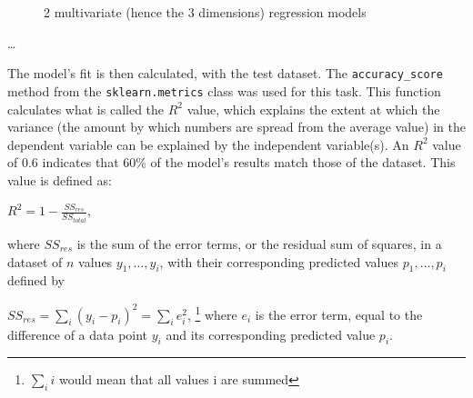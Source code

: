 \documentclass[11pt,letterpaper]{article}
\begin{document}
\begin{figure}[h]
    \centering
    \qquad
    \caption{2 multivariate (hence the 3 dimensions) regression models}
    \label{fig:example}
\end{figure}


\dots

The model's fit is then calculated, with the test dataset. The \verb|accuracy_score| method 
from the \verb|sklearn.metrics| class was used for this task. This function calculates what 
is called the $R^2$ value, which explains the extent at which the variance (the amount by which numbers 
are spread from the average value) in the dependent variable can be explained by the independent 
variable(s). An $R^2$ value of 0.6 indicates that 60\% of the model's results match those of the 
dataset. This value is defined as: 

$R^2 = 1 - \frac{SS_{res}}{SS_{total}}$,

where $SS_{res}$ is the sum of the error terms, or the residual sum of squares, in a dataset of $n$ 
values $y_1,\dots, y_i$, with their corresponding predicted values $p_1,\dots, p_i$ defined by 

$SS_{res} = \sum_{i} (y_i - p_i)^2 = \sum_{i} e_i^2$, \footnote{$\sum_i i$ would mean that all values i 
are summed} where $e_i$ is the error term, equal to the difference of a data point $y_i$ 
and its corresponding predicted value $p_i$.
\end{document}
